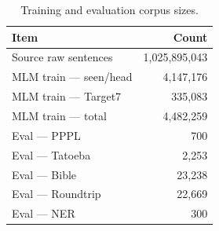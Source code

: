 \begin{table}[h]\centering\small
\caption{Training and evaluation corpus sizes.}
\label{tab:corpus}
\begin{tabular}{@{}lr@{}}
\toprule
Item & Count \\
\midrule
Source raw sentences & 1,025,895,043 \\
MLM train --- seen/head & 4,147,176 \\
MLM train --- Target7 & 335,083 \\
MLM train --- total & 4,482,259 \\
\midrule
Eval --- PPPL & 700 \\
Eval --- Tatoeba & 2,253 \\
Eval --- Bible & 23,238 \\
Eval --- Roundtrip & 22,669 \\
Eval --- NER & 300 \\
\bottomrule
\end{tabular}
\end{table}
